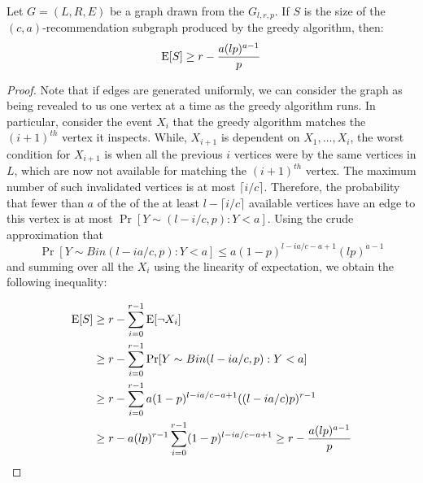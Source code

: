 \begin{thm}
Let $G=(L,R,E)$ be a graph drawn from the $G_{l,r,p}$. If $S$ is the size of the $(c,a)$-recommendation subgraph produced by the greedy algorithm, then:
\[ \text{E}[S] \geq r - \frac{a(lp)^{a-1}}{p}\]
\end{thm}
\begin{proof}
Note that if edges are generated uniformly, we can consider the
graph as being revealed to us one vertex at a time as the greedy
algorithm runs. In particular, consider the event $X_i$ that the
greedy algorithm matches the $(i+1)^{th}$ vertex it inspects. While,
$X_{i+1}$ is dependent on $X_1,\ldots, X_i$, the worst condition for
$X_{i+1}$ is when all the previous $i$ vertices were by the same
vertices in $L$, which are now not available for matching the
$(i+1)^{th}$ vertex. The maximum number of such invalidated vertices
is at most $\lceil i/c \rceil$. Therefore, the probability that fewer
than $a$ of the of the at least $l-\lceil i/c \rceil $ available 
vertices have an edge to this vertex is at most $\Pr[Y\sim (l-i/c,p): Y < a]$.
Using the crude approximation that
\[ \Pr[Y\sim Bin(l-ia/c,p): Y < a] \leq a(1-p)^{l-ia/c-a+1}(lp)^{a-1}\]
and summing over all the $X_i$ using the linearity of expectation,
we obtain the following inequality:

\begin{align*}
      \text{E}[S]
&\geq r - \sum_{i=0}^{r-1} \text{E}[\lnot X_i] \\
&\geq r - \sum_{i=0}^{r-1} \Pr[Y \sim Bin(l-ia/c,p): Y < a] \\
&\geq r - \sum_{i=0}^{r-1}a(1-p)^{l-ia/c-a+1}((l-ia/c)p)^{r-1} \\
&\geq r - a(lp)^{r-1}\sum_{i=0}^{r-1}(1-p)^{l-ia/c-a+1} \geq r - \frac{a(lp)^{a-1}}{p}\\
\end{align*}
\end{proof} 
